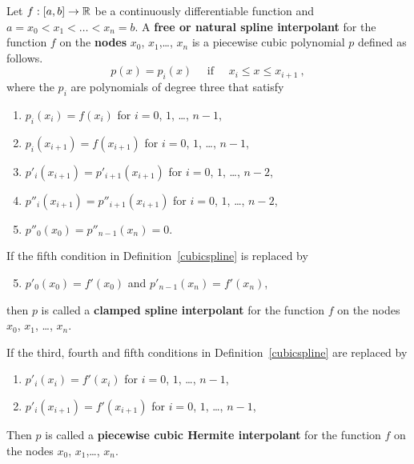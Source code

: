 \begin{defn}
Let $f:[a,b]\rightarrow \mathbb{R}$ be a continuously differentiable
function and $a = x_0 < x_1 < \ldots < x_n = b$.  A
{\bfseries free or natural spline interpolant} for the function $f$ on
the {\bfseries nodes} $x_0$, $x_1$,\ldots, $x_n$ is a
piecewise cubic polynomial $p$ defined as follows.
\[
p(x) = p_i(x) \quad \text{ if } \quad  x_i \leq x \leq x_{i+1} \ ,
\]
where the $p_i$ are polynomials of degree three that satisfy
\begin{enumerate}
\item $p_i(x_i) = f(x_i)$ for $i=0$, $1$, \ldots , $n-1$,
\item $p_i(x_{i+1}) = f(x_{i+1})$ for $i=0$, $1$, \ldots, $n-1$,
\item $p'_i(x_{i+1}) = p'_{i+1}(x_{i+1})$ for $i=0$, $1$, \ldots, $n-2$,
\item $p''_i(x_{i+1}) = p''_{i+1}(x_{i+1})$ for $i=0$, $1$, \ldots, $n-2$,
\item $p''_0(x_0) = p''_{n-1}(x_n) = 0$.
\end{enumerate}
\label{cubicspline}
\end{defn}

\begin{defn}
If the fifth condition in Definition~\ref{cubicspline} is replaced
by
\begin{enumerate}
\setcounter{enumi}{4}
\item $p'_0(x_0) = f'(x_0)$ and $p'_{n-1}(x_n) = f'(x_n)$,
\end{enumerate}
then $p$ is called a
{\bfseries clamped spline interpolant}
for the function $f$ on the nodes $x_0$, $x_1$, \ldots, $x_n$.

\noindent If the third, fourth and fifth conditions in
Definition~\ref{cubicspline} are replaced by
\begin{enumerate}
\renewcommand{\labelenumii}{\arabic{enumii}.}
\setcounter{enumii}{2}
\item $p'_i(x_i) = f'(x_i)$ for $i=0$, $1$, \ldots, $n-1$,
\item $p'_i(x_{i+1}) = f'(x_{i+1})$ for $i=0$, $1$, \ldots, $n-1$,
\end{enumerate}
Then $p$ is called a
{\bfseries piecewise cubic Hermite interpolant} for the function $f$ on the nodes $x_0$,
$x_1$,\ldots, $x_n$.
\end{defn}

